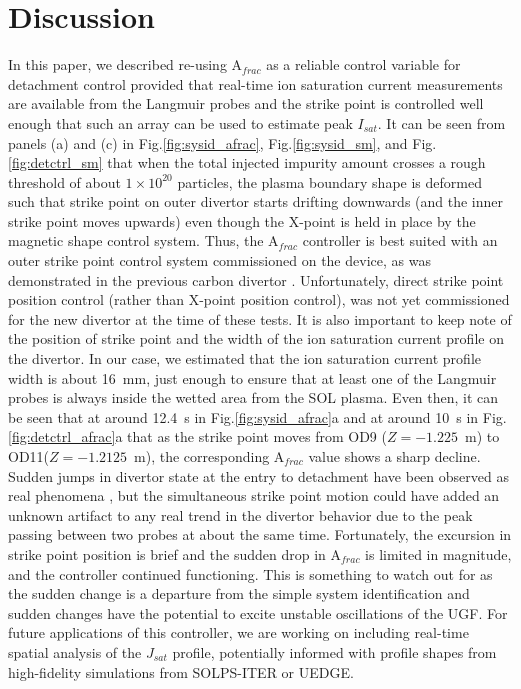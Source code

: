 \documentclass[10pt]{iopart}
\newcommand{\Afrac}{A$_{frac}$}
\begin{document}
\section{Discussion}
\label{sec:discussion}

In this paper, we described re-using \Afrac{} as a reliable control variable for detachment control provided that real-time ion saturation current measurements are available from the Langmuir probes and the strike point is controlled well enough that such an array can be used to estimate peak $I_{sat}$.
It can be seen from panels (a) and (c) in Fig.\ref{fig:sysid_afrac}, Fig.\ref{fig:sysid_sm}, and Fig.\ref{fig:detctrl_sm} that when the total injected impurity amount crosses a rough threshold of about $1\times10^{20}$ particles, the plasma boundary shape is deformed such that strike point on outer divertor starts drifting downwards (and the inner strike point moves upwards) even though the X-point is held in place by the magnetic shape control system.
Thus, the \Afrac{} controller is best suited with an outer strike point control system commissioned on the device, as was demonstrated in the previous carbon divertor \cite{Eldon_2022_PPCF}.
Unfortunately, direct strike point position control (rather than X-point position control), was not yet commissioned for the new divertor at the time of these tests.
It is also important to keep note of the position of strike point and the width of the ion saturation current profile on the divertor.
In our case, we estimated that the ion saturation current profile width is about 16~mm, just enough to ensure that at least one of the Langmuir probes is always inside the wetted area from the \ac{SOL} plasma.
Even then, it can be seen that at around 12.4~s in Fig.\ref{fig:sysid_afrac}a and at around 10~s in Fig.\ref{fig:detctrl_afrac}a that as the strike point moves from OD9 ($Z=-1.225$~m) to OD11($Z=-1.2125$~m), the corresponding \Afrac{} value shows a sharp decline.
Sudden jumps in divertor state at the entry to detachment have been observed as real phenomena \cite{mclean_2015_jnm,Eldon_2017_NF}, but the simultaneous strike point motion could have added an unknown artifact to any real trend in the divertor behavior due to the peak passing between two probes at about the same time.
Fortunately, the excursion in strike point position is brief and the sudden drop in \Afrac{} is limited in magnitude, and the controller continued functioning.
This is something to watch out for as the sudden change is a departure from the simple system identification and sudden changes have the potential to excite unstable oscillations of the \ac{UGF}.
For future applications of this controller, we are working on including real-time spatial analysis of the $J_{sat}$ profile, potentially informed with profile shapes from high-fidelity simulations from SOLPS-ITER or UEDGE.
\end{document}
